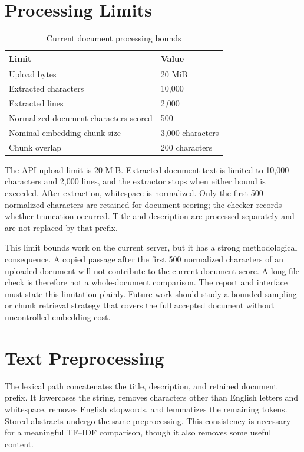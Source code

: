\documentclass[12pt,a4paper]{report}
\begin{document}
\section{Processing Limits}
\begin{table}[htbp]\centering\caption{Current document processing bounds}\label{tab:limits}
\begin{tabular}{p{}p{}}\hline
Limit & Value\\\hline
Upload bytes & 20 MiB\\
Extracted characters & 10,000\\
Extracted lines & 2,000\\
Normalized document characters scored & 500\\
Nominal embedding chunk size & 3,000 characters\\
Chunk overlap & 200 characters\\\hline
\end{tabular}\end{table}
The API upload limit is 20 MiB. Extracted document text is limited to 10,000 characters and 2,000 lines, and the extractor stops when either bound is exceeded. After extraction, whitespace is normalized. Only the first 500 normalized characters are retained for document scoring; the checker records whether truncation occurred. Title and description are processed separately and are not replaced by that prefix.

This limit bounds work on the current server, but it has a strong methodological consequence. A copied passage after the first 500 normalized characters of an uploaded document will not contribute to the current document score. A long-file check is therefore not a whole-document comparison. The report and interface must state this limitation plainly. Future work should study a bounded sampling or chunk retrieval strategy that covers the full accepted document without uncontrolled embedding cost.

\section{Text Preprocessing}
The lexical path concatenates the title, description, and retained document prefix. It lowercases the string, removes characters other than English letters and whitespace, removes English stopwords, and lemmatizes the remaining tokens. Stored abstracts undergo the same preprocessing. This consistency is necessary for a meaningful TF--IDF comparison, though it also removes some useful content.
\end{document}
